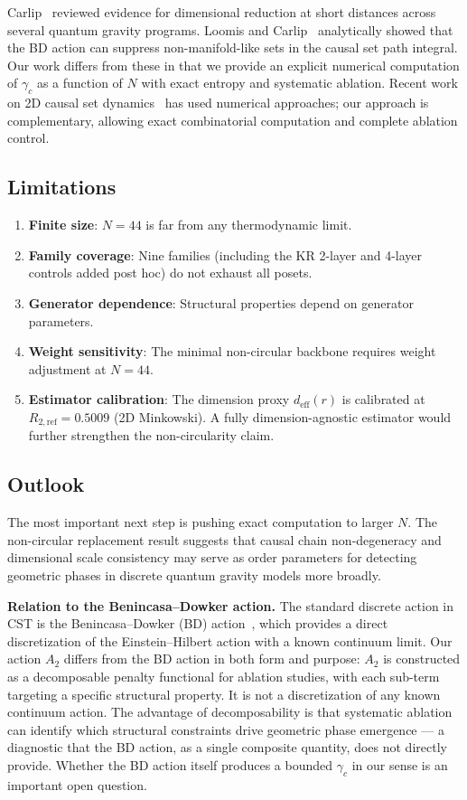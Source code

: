 \documentclass[entropy,article,submit,pdftex,moreauthors]{Definitions/mdpi}
\begin{document}
Carlip~\cite{carlip2017} reviewed evidence for dimensional reduction at short distances across several quantum gravity programs. Loomis and Carlip~\cite{loomis2018} analytically showed that the BD action can suppress non-manifold-like sets in the causal set path integral. Our work differs from these in that we provide an explicit numerical computation of $\gamma_c$ as a function of $N$ with exact entropy and systematic ablation. Recent work on 2D causal set dynamics~\cite{cunningham2020} has used numerical approaches; our approach is complementary, allowing exact combinatorial computation and complete ablation control.

\subsection{Limitations}

\begin{enumerate}[nosep]
    \item \textbf{Finite size}: $N = 44$ is far from any thermodynamic limit.
    \item \textbf{Family coverage}: Nine families (including the KR 2-layer and 4-layer controls added post hoc) do not exhaust all posets.
    \item \textbf{Generator dependence}: Structural properties depend on generator parameters.
    \item \textbf{Weight sensitivity}: The minimal non-circular backbone requires weight adjustment at $N = 44$.
    \item \textbf{Estimator calibration}: The dimension proxy $d_{\text{eff}}(r)$ is calibrated at $R_{2,\text{ref}} = 0.5009$ (2D Minkowski). A fully dimension-agnostic estimator would further strengthen the non-circularity claim.
\end{enumerate}

\subsection{Outlook}

The most important next step is pushing exact computation to larger $N$. The non-circular replacement result suggests that causal chain non-degeneracy and dimensional scale consistency may serve as order parameters for detecting geometric phases in discrete quantum gravity models more broadly.

\textbf{Relation to the Benincasa--Dowker action.} The standard discrete action in CST is the Benincasa--Dowker (BD) action~\cite{benincasa2010,benincasa2011}, which provides a direct discretization of the Einstein--Hilbert action with a known continuum limit. Our action $A_2$ differs from the BD action in both form and purpose: $A_2$ is constructed as a decomposable penalty functional for ablation studies, with each sub-term targeting a specific structural property. It is not a discretization of any known continuum action. The advantage of decomposability is that systematic ablation can identify which structural constraints drive geometric phase emergence --- a diagnostic that the BD action, as a single composite quantity, does not directly provide. Whether the BD action itself produces a bounded $\gamma_c$ in our sense is an important open question.
\end{document}
